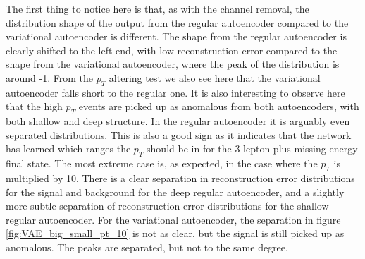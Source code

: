 The first thing to notice here is that, as with the channel removal, the distribution shape of the output from the regular autoencoder compared to the
variational autoencoder is different. The shape from the regular autoencoder is clearly shifted to the left end, with low reconstruction error compared 
to the shape from the variational autoencoder, where the peak of the distribution is around -1. From the $p_T$ altering test we also see here that the 
variational autoencoder falls short to the regular one. It is also interesting to observe here that the high $p_T$ events are picked up as anomalous from both
autoencoders, with both shallow and deep structure. In the regular autoencoder it is arguably even separated distributions. This is also a good sign as it 
indicates that the network has learned which ranges the $p_T$ should be in for the 3 lepton plus missing energy final state. The most extreme case is, 
as expected, in the case where the $p_T$ is multiplied by 10. There is a clear separation in reconstruction error distributions for the
signal and background for the deep regular autoencoder, and a slightly more subtle separation of reconstruction error distributions for 
the shallow regular autoencoder. For the variational autoencoder, the separation in figure \ref{fig:VAE_big_small_pt_10} is not as clear, 
but the signal is still picked up as anomalous. The peaks are separated, but not to the same degree. 


